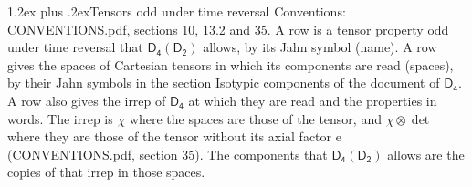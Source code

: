 \documentclass[10pt,a4paper]{article}
\makeatletter
\renewcommand\section{\@startsection{section}{1}{\z@}{-3ex plus -1ex minus -.2ex}%
  {1.2ex plus .2ex}{\normalfont\large\sffamily\bfseries\color{parttitle}}}
\numberwithin{equation}{section}
\newcommand{\grp}[1]{\mathsf{#1}}
\newcommand{\irrprod}{\otimes}
\makeatother
\begin{document}
\section{Tensors odd under time reversal}\label{s:time_odd}
Conventions: \href{../../CONVENTIONS.pdf}{CONVENTIONS.pdf}, sections \href{../../../rotation/CONVENTIONS.pdf\#conv.10}{10}, \href{../../../rotation/CONVENTIONS.pdf\#conv.13.2}{13.2} and \href{../../CONVENTIONS.pdf\#conv.35}{35}.
\leavevmode\label{n:head.name.property}A row is a tensor property odd under time reversal that $\grp{D_{4}}(\grp{D_{2}})$ allows, by its Jahn symbol (name). \label{n:head.spaces}A row gives the spaces of Cartesian tensors in which its components are read (spaces), by their Jahn symbols in the section Isotypic components of the document of \href{../../../rotation/data/pdf/D4.pdf}{$\grp{D_{4}}$}. \label{n:head.properties}A row also gives the irrep of $\grp{D_{4}}$ at which they are read and the properties in words. The irrep is $\chi$ where the spaces are those of the tensor, and $\chi \irrprod \det$ where they are those of the tensor without its axial factor e (\href{../../CONVENTIONS.pdf}{CONVENTIONS.pdf}, section \href{../../CONVENTIONS.pdf\#conv.35}{35}). The components that $\grp{D_{4}}(\grp{D_{2}})$ allows are the copies of that irrep in those spaces.
\end{document}
